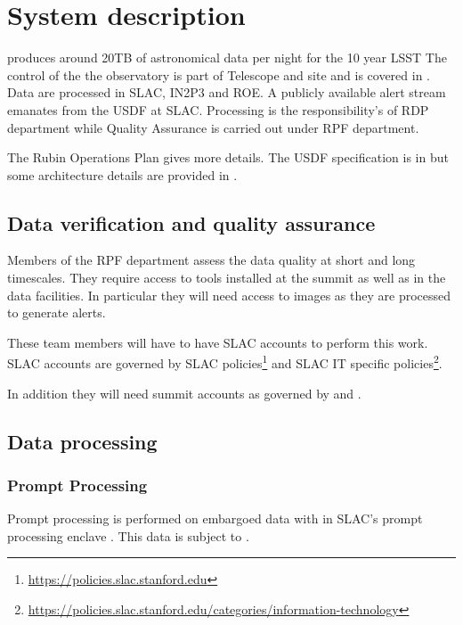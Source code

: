 \section{System description} \label{sec:desc}

\VRO produces around 20TB of astronomical data per night for the 10 year \gls{LSST}
The control of the the observatory is part of Telescope and site and is covered in .
Data are processed in \gls{SLAC}, \gls{IN2P3} and \gls{ROE}.
A publicly available alert stream emanates from the \gls{USDF} at \gls{SLAC}.
Processing is the responsibility's of \gls{RDP} department while \gls{Quality Assurance} is carried out under \gls{RPF} department.

The Rubin \gls{Operations} Plan  gives more details.
The \gls{USDF} specification is in  but some architecture details are provided in .






\subsection{Data verification and quality assurance }
Members of the \gls{RPF} department assess the data quality at short and long timescales.
They require access to tools installed at the summit as well as in the data facilities.
In particular they will need access to images as they are processed to generate alerts.

These team members will have to have \gls{SLAC} accounts to perform this work.
\gls{SLAC} accounts are governed by SLAC policies\footnote{\url{https://policies.slac.stanford.edu}} and
\gls{SLAC} IT specific policies\footnote{\url{https://policies.slac.stanford.edu/categories/information-technology}}.

In addition they will need summit accounts as governed by  and .



\subsection{Data processing}
\subsubsection{Prompt  Processing}
Prompt processing is performed on embargoed data with in SLAC's prompt processing enclave .
This data is subject to \citep{ACP}.

